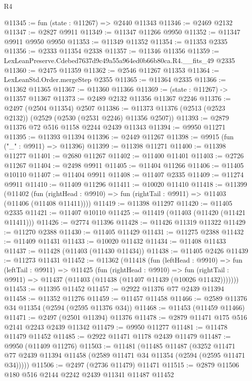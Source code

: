\begin{lexlean}{R4}
\begin{coremodule}
@11345 := fun (state : @11267) => @2440 @11343
@11346 := @2469 @2132
@11347 := @2827 @9911
@11349 := @11347 @11266 @9950
@11352 := @11347 @9911 @9950 @9950
@11353 := @11349 @11352
@11354 := @11353 @2335
@11356 := @2333 @11354 @2338
@11357 := @11346 @11356
@11359 := LexLeanPreserve.Cdebed7637d9c49a55a964ed0b66b80ca.R4.__fits_49 @2335
@11360 := @2475 @11359
@11362 := @2546 @11267 @11353
@11364 := LexLeanStd.Order.mergeStep @2355
@11365 := @11364 @2335
@11366 := @11362 @11365
@11367 := @11360 @11366
@11369 := (state : @11267) -> @11357 @11367
@11373 := @2489 @2132 @11356 @11367 @2246
@11376 := @2497 (@2504 @11354) @2507
@11386 := @11373 @11376 (@2513 (@2523 @2132)) (@2529 (@2530 (@2531 @2246) @11356 @2507))
@11393 := @2879 @11376 @72 @516 @1158 @2244 @2439 @11343
@11394 := @9950 @11271
@11395 := @11393 @11394
@11396 := @2449 @11267
@11398 := @9915 (fun ("_" : @9911) => @11396)
@11399 := @11398 @11271
@11400 := @11398 @11277
@11401 := @2680 @11267
@11402 := @11400 @11401
@11403 := @2726 @11267
@11404 := @2498 @9911
@11405 := @11404 @11266
@11406 := @11405 @10110
@11407 := @11404 @9911
@11408 := @11407 @2335
@11409 := @11274 @9911
@11410 := @11409 @11296
@11411 := @10020 @11410
@11418 := @11399
    (@11402 (fun (rightHead : @9910) => fun (rightTail : @9911) => @11403 (@11406 (@11408 @11411))))
@11419 := @11398 @11297
@11420 := @11405 @2335
@11421 := @11407 @10110
@11425 := @11419 (@11403 (@11420 (@11421 @11411)))
@11426 := @2774 @11396
@11428 := @11426 @11319 @11322
@11429 := @11270 @2388
@11430 := @11405 @11429
@11431 := @11275 @2388
@11432 := @11409 @11431
@11433 := @10020 @11432
@11434 := @11408 @11433
@11437 := @11428 (@11403 (@11430 @11434))
@11438 := @11405 @2426
@11439 := @11273 @11431
@11452 := @11362
    (@11418
      (fun (leftHead : @9910) =>
      fun (leftTail : @9911) =>
      @11425
        (fun (rightHead : @9910) =>
        fun (rightTail : @9911) => @11437 (@11403 (@11438 (@11407 @11439 (@10026 @11432)))))))
@11453 := @11395 @11452
@11457 := @2922 @11376 @77 @2439 @11394
@11458 := @11352 @11276
@11459 := @11457 @11458
@11466 := @2589 @11376 @34 @11354 (@2594 (@2595 @11376 @34))
@11468 := @11453 (@11459 @11466)
@11471 := @2497 (@2501 @11394) @11376
@11478 := @2879 @11471 @175 @516 @2141 @2243 @2439 @11342
@11479 := @9950 @11277
@11481 := @11478 @11479 @11452
@11485 := @2922 @11471 @1178 @2439 @11479
@11487 := @9950 (@11409 @11276)
@11503 := @11481
    (@11485
      @11487
      (@3252 @11471 @77 @2439 @11394 @11458 (@2589 @11471 @34 @11354 (@2594 (@2595 @11471 @34)))))
@11506 := @2497 (@2736 @11479) @11471
@11515 := @2879 @11506 @180 @516 @2144 @2242 @2439 @11341 @11487 @11452

\end{coremodule}
\end{lexlean}
